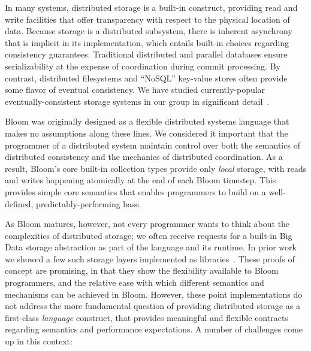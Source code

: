 In many systems, distributed storage is a built-in construct, providing read and write facilities that offer transparency with respect to the physical location of data.  Because storage is a distributed subsystem, there is inherent asynchrony that is implicit in its implementation, which  entails built-in choices regarding consistency guarantees. Traditional distributed and parallel databases ensure serializability at the expense of coordination during commit processing.  By contrast, distributed filesystems and ``NoSQL'' key-value stores often provide some flavor of eventual consistency.  We have studied currently-popular eventually-consistent storage systems in our group in significant detail~\cite{boomanalytics,bailis}.

Bloom was originally designed as a flexible distributed systems language that makes no assumptions along these lines.  We considered it important that the  programmer of a distributed system maintain control over both the semantics of distributed consistency and the mechanics of distributed coordination.  As a result, Bloom's core built-in collection types provide only \emph{local} storage, with reads and writes happening atomically at the end of each Bloom timestep.  This provides simple core semantics that enables programmers to build on a well-defined, predictably-performing base.

As Bloom matures, however, not every programmer wants to think about the complexities of distributed storage; we often receive requests for a built-in Big Data storage abstraction as part of the language and its runtime.  In prior work we showed a few such storage layers implemented as libraries~\cite{boom-eurosys,sandbox}.  These proofs of concept are promising, in that they show the flexibility available to Bloom programmers, and the relative ease with which different semantics and mechanisms can be achieved in Bloom.  However, these point implementations do not address the more fundamental question of providing distributed storage as a first-class \emph{language} construct, that provides meaningful and flexible contracts regarding semantics and performance expectations.   A number of challenges come up in this context:

